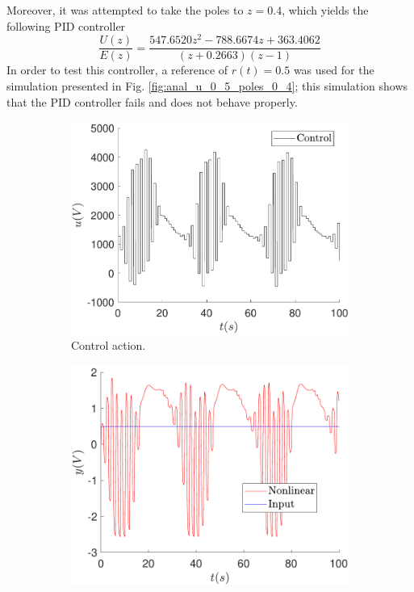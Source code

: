 	Moreover, it was attempted to take the poles to $z=0.4$, which yields the following PID controller
	\begin{equation}
    \dfrac{U(z)}{E(z)}=\dfrac{547.6520z^2-788.6674z+363.4062}{(z+0.2663)(z-1)}
	\end{equation}
    In order to test this controller, a reference of $r(t)=0.5$ was used for the simulation presented in Fig. \ref{fig:anal_u_0_5_poles_0_4}; this simulation shows that the PID controller fails and does not behave properly.
	
	\begin{figure}
        \centering
        \begin{subfigure}[b]{0.475\textwidth}
            \centering
            \includegraphics[scale=0.425]{files/heuristic/analytic/control_analytic_u_0_5_poles_0_4.pdf}
            \caption{Control action.}
        \end{subfigure}
        \vskip0.1cm
        \begin{subfigure}[b]{0.475\textwidth}   
            \centering 
            \includegraphics[scale=0.425]{files/heuristic/analytic/analytic_u_0_5_poles_0_4.pdf}

\end{subfigure}
\end{figure}
